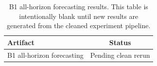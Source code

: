 \begin{table}[!t]
\centering
\footnotesize
\begin{tabular}{@{}lc@{}}
\toprule
Artifact & Status \\
\midrule
B1 all-horizon forecasting & Pending clean rerun \\
\bottomrule
\end{tabular}
\caption{B1 all-horizon forecasting results. This table is intentionally blank until new results are generated from the cleaned experiment pipeline.}
\label{tab:b1_all_horizons}
\end{table}
